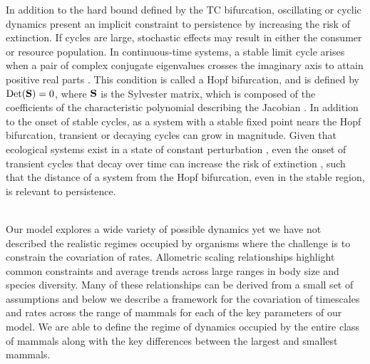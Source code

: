 \documentclass[12pt,english]{article}
\begin{document}
\begin{spacing}{1.9}
In addition to the hard bound defined by the TC bifurcation, oscillating or cyclic dynamics present an implicit constraint to persistence by increasing the risk of extinction.
If cycles are large, stochastic effects may result in either the consumer or resource population.
In continuous-time systems, a stable limit cycle arises when a pair of complex conjugate eigenvalues crosses the imaginary axis to attain positive real parts \citep{GuckHolmes}.
This condition is called a Hopf bifurcation, and is defined by ${\rm Det}({\bf S}) = 0$, where $\bf S$ is the Sylvester matrix, which is composed of the coefficients of the characteristic polynomial describing the Jacobian \citep{Gross:2004p2428}.
In addition to the onset of stable cycles, as a system with a stable fixed point nears the Hopf bifurcation, transient or decaying cycles can grow in magnitude.
Given that ecological systems exist in a state of constant perturbation \citep{Hastings:2001jh}, even the onset of transient cycles that decay over time can increase the risk of extinction \citep{Neubert:1997wk,Caswell:2005eo,Neubert:2009td}, such that the distance of a system from the Hopf bifurcation, even in the stable region, is relevant to persistence.






 \\ \nonumber
Our model explores a wide variety of possible dynamics yet we have not described the realistic regimes occupied by organisms where the challenge is to constrain the covariation of rates. Allometric scaling relationships highlight common constraints and average trends across large ranges in body size and species diversity. Many of these relationships can be derived from a small set of assumptions and below we describe a framework for the covariation of timescales and rates across the range of mammals for each of the key parameters of our model. We are able to define the regime of dynamics occupied by the entire class of mammals along with the key differences between the largest and smallest mammals.




\end{spacing}
\end{document}
